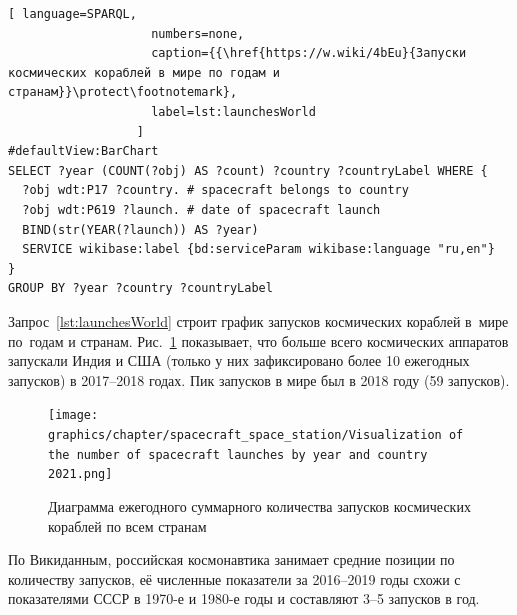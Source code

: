 \begin{lstlisting}[ language=SPARQL, 
                    numbers=none, 
                    caption={{\href{https://w.wiki/4bEu}{Запуски космических кораблей в мире по годам и странам}}\protect\footnotemark}, 
                    label=lst:launchesWorld
                  ]
#defaultView:BarChart
SELECT ?year (COUNT(?obj) AS ?count) ?country ?countryLabel WHERE {
  ?obj wdt:P17 ?country. # spacecraft belongs to country 
  ?obj wdt:P619 ?launch. # date of spacecraft launch
  BIND(str(YEAR(?launch)) AS ?year)
  SERVICE wikibase:label {bd:serviceParam wikibase:language "ru,en"}
}
GROUP BY ?year ?country ?countryLabel
\end{lstlisting}



Запрос~\ref{lst:launchesWorld} строит график 
запусков космических кораблей в~мире по~годам и странам. 
Рис.~\ref{fig:launchesWorld} показывает, что больше всего космических аппаратов 
запускали Индия и США 
(только у них зафиксировано более 10 ежегодных запусков) в 2017--2018 годах. 
Пик запусков в мире был в 2018 году (59 запусков). 




\newpage

\begin{figure}[h!]
  \texttt{[image: graphics/chapter/spacecraft\_space\_station/Visualization of the number of spacecraft launches by year and country 2021.png]}
  \caption[График запусков космических кораблей в мире по годам и странам, 2021 год.]{Диаграмма ежегодного суммарного количества запусков космических кораблей по всем странам}
  \label{fig:launchesWorld}%
\end{figure}


\newpage

По Викиданным, российская космонавтика занимает средние позиции по количеству запусков, 
её численные показатели за 2016--2019 годы схожи с показателями СССР в 1970-е и 1980-е годы 
и составляют 3--5 запусков в год.



